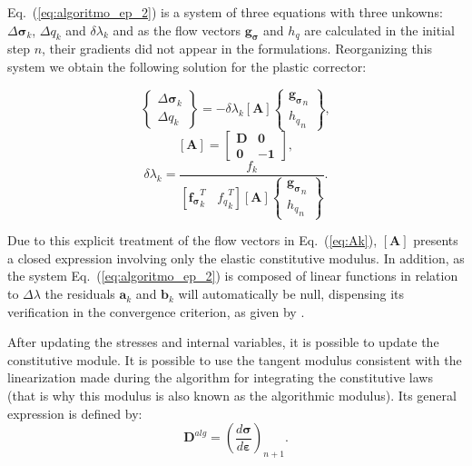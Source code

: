 \documentclass[Journal,letterpaper]{ascelike-new}
\newcommand{\All}{\boldsymbol A}
\newcommand{\al}{\boldsymbol a}
\newcommand{\bl}{\boldsymbol b}
\newcommand{\dfds}{\boldsymbol{f_\sigma}}
\newcommand{\dfdq}{{f_q}}
\newcommand{\dgds}{\boldsymbol{g_\sigma}}
\newcommand{\Dsdee}{\boldsymbol{D}}
\newcommand{\hl}{{h_q}}
\newcommand{\onell}{\boldsymbol{1}}
\newcommand{\strain}{\boldsymbol{\varepsilon}}
\newcommand{\stress}{\boldsymbol{\sigma}}
\newcommand{\zerol}{\boldsymbol 0}
\begin{document}
Eq.~(\ref{eq:algoritmo_ep_2}) is a system of three equations with three unkowns: $\Delta \stress_k$, $\Delta q_k$ and $\delta \lambda_k$ and as the flow vectors $\dgds$ and $\hl$ are calculated in the initial step $n$, their gradients did not appear in the formulations. Reorganizing this system we obtain the following solution for the plastic corrector:

\begin{equation}
	\label{eq:algoritmo_ep_3}
	\left\{
	\begin{array}{lcl}
		\Delta \stress_k \\
		\Delta q_k
	\end{array}
	\right\} = -\delta\lambda_k \left[ \All \right]
	\left\{	
	\begin{array}{lcl}
		\dgds_n \\
		\hl_n
	\end{array}
	\right\},
\end{equation}
\begin{equation}
	\label{eq:Ak}
	\left[ \All \right] =
	\begin{bmatrix}
		\Dsdee & \zerol \\
		\zerol & -\onell
	\end{bmatrix},
\end{equation}
\begin{equation}
	\label{eq:deltalambdak}
	\delta \lambda_k = \dfrac{f_k}{\left[\dfds_k^T~~~~\dfdq_k^T\right]\left[\All \right]\left\{ 
		\begin{array}{lcl}
			\dgds_n \\ 
			\hl_n
		\end{array}\right\}}.
\end{equation}

Due to this explicit treatment of the flow vectors in Eq.~(\ref{eq:Ak}), $\left[\All \right]$ presents a closed expression involving only the elastic constitutive modulus. In addition, as the system Eq.~(\ref{eq:algoritmo_ep_2}) is composed of linear functions in relation to $\Delta \lambda$ the residuals  $\al_k$ and $\bl_k$ will automatically be null, dispensing its verification in the convergence criterion, as given by . 

After updating the stresses and internal variables, it is possible to update the constitutive module. It is possible to use the tangent modulus consistent with the linearization made during the algorithm for integrating the constitutive laws (that is why this modulus is also known as the algorithmic modulus). Its general expression is defined by:
\begin{equation}
	\label{eq:D_alg1}
	\Dsdee^{alg} = \left(\dfrac{d\stress}{d\strain} \right)_{n+1}.
\end{equation}
\end{document}

